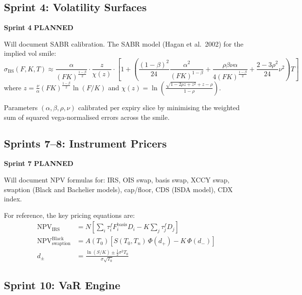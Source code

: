 \documentclass[11pt, a4paper]{article}
\newcommand{\sprintstatus}[3]{%
  \begin{tcolorbox}[sprintbox]
  \small
  \textbf{\color{navy}Sprint #1} \quad
  \textbf{\color{#2}#3}
  \end{tcolorbox}\vspace{4pt}
}
\begin{document}
\subsection{Sprint 4: Volatility Surfaces}

\sprintstatus{4}{amber!80!black}{PLANNED}

Will document SABR calibration. The SABR model (Hagan et al.\ 2002) for the
implied vol smile:
\begin{equation}
  \sigma_{\mathrm{BS}}(F,K,T) \approx
    \frac{\alpha}{(FK)^{\frac{1-\beta}{2}}}
    \cdot\frac{z}{\chi(z)}
    \cdot\left[1 + \left(\frac{(1-\beta)^2}{24}\frac{\alpha^2}{(FK)^{1-\beta}}
                          + \frac{\rho\beta\nu\alpha}{4(FK)^{\frac{1-\beta}{2}}}
                          + \frac{2-3\rho^2}{24}\nu^2\right)T\right]
\end{equation}
where $z = \frac{\nu}{\alpha}(FK)^{\frac{1-\beta}{2}}\ln(F/K)$ and
$\chi(z) = \ln\!\left(\frac{\sqrt{1-2\rho z+z^2}+z-\rho}{1-\rho}\right)$.

Parameters $(\alpha,\beta,\rho,\nu)$ calibrated per expiry slice by minimising
the weighted sum of squared vega-normalised errors across the smile.

\subsection{Sprints 7–8: Instrument Pricers}

\sprintstatus{7}{amber!80!black}{PLANNED}

Will document NPV formulas for: IRS, OIS swap, basis swap, XCCY swap, swaption
(Black and Bachelier models), cap/floor, CDS (ISDA model), CDX index.

For reference, the key pricing equations are:
\begin{align}
  \mathrm{NPV}_{\mathrm{IRS}} &=
    N\!\left[\sum_{i}\tau_i^f F_i^{\mathrm{basis}} D_i
           - K\sum_{j}\tau_j^f D_j\right]  \\[4pt]
  \mathrm{NPV}_{\mathrm{swaption}}^{\mathrm{Black}} &=
    A(T_0)\left[S(T_0,T_n)\,\Phi(d_+) - K\,\Phi(d_-)\right] \\[4pt]
  d_{\pm} &= \frac{\ln(S/K) \pm \frac{1}{2}\sigma^2 T_0}{\sigma\sqrt{T_0}}
\end{align}

\subsection{Sprint 10: VaR Engine}
\end{document}
